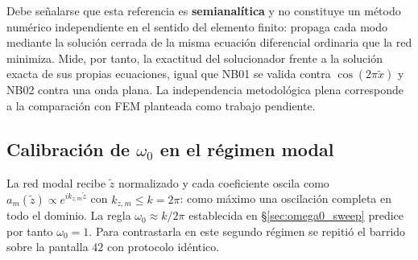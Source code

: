 Debe señalarse que esta referencia es \textbf{semianalítica} y no constituye un
método numérico independiente en el sentido del elemento finito: propaga cada
modo mediante la solución cerrada de la misma ecuación diferencial ordinaria que
la red minimiza. Mide, por tanto, la exactitud del solucionador frente a la
solución exacta de sus propias ecuaciones, igual que NB01 se valida contra
$\cos(2\pi\tilde x)$ y NB02 contra una onda plana. La independencia metodológica
plena corresponde a la comparación con FEM planteada como trabajo pendiente.

\subsection{Calibración de $\omega_0$ en el régimen modal}
\label{sec:nb03_omega}

La red modal recibe $\tilde z$ normalizado y cada coeficiente oscila como
$a_m(\tilde z)\propto e^{i k_{z,m}\tilde z}$ con $k_{z,m}\leq k=2\pi$: como
máximo una oscilación completa en todo el dominio. La regla
$\omega_0\approx k/2\pi$ establecida en §\ref{sec:omega0_sweep} predice por
tanto $\omega_0=1$. Para contrastarla en este segundo régimen se repitió el
barrido sobre la pantalla $42$ con protocolo idéntico.

